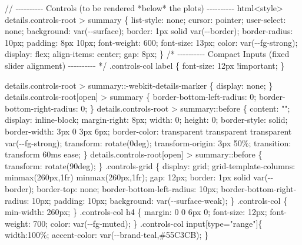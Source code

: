 \documentclass[
  letterpaper,
  DIV=11,
  numbers=noendperiod]{scrreprt}
\newenvironment{Shaded}{\begin{snugshade}}{\end{snugshade}}
\newcommand{\NormalTok}[1]{\textcolor[rgb]{0.00,0.23,0.31}{#1}}
\theoremstyle{definition}
\theoremstyle{plain}
\theoremstyle{definition}
\theoremstyle{remark}
\begin{document}
\begin{Shaded}
\begin{Highlighting}[]
\NormalTok{// {-}{-}{-}{-}{-}{-}{-}{-}{-}{-} Controls (to be rendered *below* the plots) {-}{-}{-}{-}{-}{-}{-}{-}{-}{-}}
\NormalTok{html\textasciigrave{}\textless{}style\textgreater{}}
\NormalTok{details.controls{-}root \textgreater{} summary \{}
\NormalTok{  list{-}style: none; cursor: pointer; user{-}select: none;}
\NormalTok{  background: var({-}{-}surface);}
\NormalTok{  border: 1px solid var({-}{-}border);}
\NormalTok{  border{-}radius: 10px;}
\NormalTok{  padding: 8px 10px;}
\NormalTok{  font{-}weight: 600; font{-}size: 13px;}
\NormalTok{  color: var({-}{-}fg{-}strong);}
\NormalTok{  display: flex; align{-}items: center; gap: 8px;}
\NormalTok{\}}
\NormalTok{/* {-}{-}{-}{-}{-}{-}{-}{-}{-}{-} Compact Inputs (fixed slider alignment) {-}{-}{-}{-}{-}{-}{-}{-}{-}{-} */}
\NormalTok{.controls{-}col label \{ font{-}size: 12px !important; \}}

\NormalTok{details.controls{-}root \textgreater{} summary::{-}webkit{-}details{-}marker \{ display: none; \}}
\NormalTok{details.controls{-}root[open] \textgreater{} summary \{ border{-}bottom{-}left{-}radius: 0; border{-}bottom{-}right{-}radius: 0; \}}
\NormalTok{details.controls{-}root \textgreater{} summary::before \{}
\NormalTok{  content: ""; display: inline{-}block; margin{-}right: 8px; width: 0; height: 0;}
\NormalTok{  border{-}style: solid; border{-}width: 3px 0 3px 6px;}
\NormalTok{  border{-}color: transparent transparent transparent var({-}{-}fg{-}strong);}
\NormalTok{  transform: rotate(0deg); transform{-}origin: 3px 50\%; transition: transform 60ms ease;}
\NormalTok{\}}
\NormalTok{details.controls{-}root[open] \textgreater{} summary::before \{ transform: rotate(90deg); \}}
\NormalTok{.controls{-}grid \{}
\NormalTok{  display: grid;}
\NormalTok{  grid{-}template{-}columns: minmax(260px,1fr) minmax(260px,1fr);}
\NormalTok{  gap: 12px;}
\NormalTok{  border: 1px solid var({-}{-}border); border{-}top: none;}
\NormalTok{  border{-}bottom{-}left{-}radius: 10px; border{-}bottom{-}right{-}radius: 10px;}
\NormalTok{  padding: 10px;}
\NormalTok{  background: var({-}{-}surface{-}weak);}
\NormalTok{\}}
\NormalTok{.controls{-}col \{ min{-}width: 260px; \}}
\NormalTok{.controls{-}col h4 \{}
\NormalTok{  margin: 0 0 6px 0; font{-}size: 12px; font{-}weight: 700;}
\NormalTok{  color: var({-}{-}fg{-}muted);}
\NormalTok{\}}
\NormalTok{.controls{-}col input[type="range"]\{ width:100\%; accent{-}color: var({-}{-}brand{-}teal,\#55C3CB); \}}


\end{Highlighting}
\end{Shaded}
\end{document}
